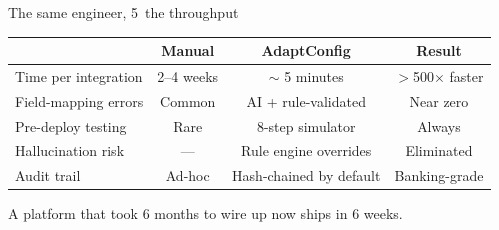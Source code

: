 \documentclass[aspectratio=169,11pt]{beamer}
\begin{document}
\begin{frame}{The same engineer, 5\texttimes\ the throughput}
\vspace{0.5em}
\begin{center}
{\small
\begin{tabular}{lccc}
\toprule
& \textbf{Manual} & \textbf{AdaptConfig} & \textbf{Result} \\
\midrule
Time per integration & 2--4 weeks & $\sim$ 5 minutes & \textcolor{ok}{$>$500$\times$ faster} \\
Field-mapping errors & Common & AI + rule-validated & \textcolor{ok}{Near zero} \\
Pre-deploy testing & Rare & 8-step simulator & \textcolor{ok}{Always} \\
Hallucination risk & --- & Rule engine overrides & \textcolor{ok}{Eliminated} \\
Audit trail & Ad-hoc & Hash-chained by default & \textcolor{ok}{Banking-grade} \\
\bottomrule
\end{tabular}
}
\end{center}

\vspace{0.7em}
\begin{center}
{\large A platform that took \textcolor{err}{6 months} to wire up now ships in \textcolor{ok}{6 weeks}.}
\end{center}
\end{frame}
\end{document}
